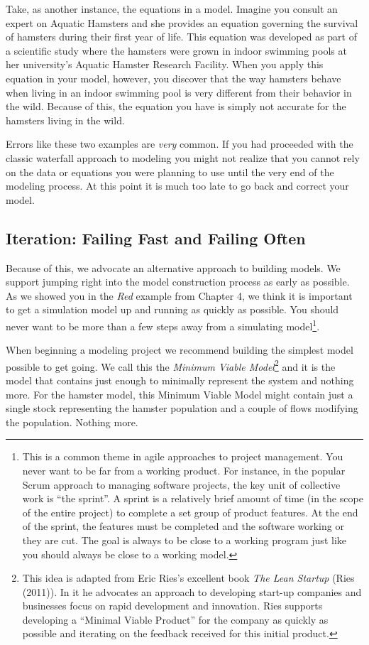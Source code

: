 \documentclass[]{memoir}
\begin{document}
Take, as another instance, the equations in a model. Imagine you consult
an expert on Aquatic Hamsters and she provides an equation governing the
survival of hamsters during their first year of life. This equation was
developed as part of a scientific study where the hamsters were grown in
indoor swimming pools at her university's Aquatic Hamster Research
Facility. When you apply this equation in your model, however, you
discover that the way hamsters behave when living in an indoor swimming
pool is very different from their behavior in the wild. Because of this,
the equation you have is simply not accurate for the hamsters living in
the wild.

Errors like these two examples are \emph{very} common. If you had
proceeded with the classic waterfall approach to modeling you might not
realize that you cannot rely on the data or equations you were planning
to use until the very end of the modeling process. At this point it is
much too late to go back and correct your model.

\subsection{Iteration: Failing Fast and Failing Often}

Because of this, we advocate an alternative approach to building models.
We support jumping right into the model construction process as early as
possible. As we showed you in the \emph{Red} example from Chapter 4, we
think it is important to get a simulation model up and running as
quickly as possible. You should never want to be more than a few steps
away from a simulating model\footnote{This is a common theme in agile
  approaches to project management. You never want to be far from a
  working product. For instance, in the popular Scrum approach to
  managing software projects, the key unit of collective work is ``the
  sprint''. A sprint is a relatively brief amount of time (in the scope
  of the entire project) to complete a set group of product features. At
  the end of the sprint, the features must be completed and the software
  working or they are cut. The goal is always to be close to a working
  program just like you should always be close to a working model.}.

When beginning a modeling project we recommend building the simplest
model possible to get going. We call this the \emph{Minimum Viable
Model}\footnote{This idea is adapted from Eric Ries's excellent book
  \emph{The Lean Startup} (Ries (2011)). In it he advocates an approach
  to developing start-up companies and businesses focus on rapid
  development and innovation. Ries supports developing a ``Minimal
  Viable Product'' for the company as quickly as possible and iterating
  on the feedback received for this initial product.} and it is the
model that contains just enough to minimally represent the system and
nothing more. For the hamster model, this Minimum Viable Model might
contain just a single stock representing the hamster population and a
couple of flows modifying the population. Nothing more.
\end{document}
